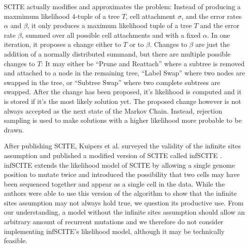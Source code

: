 \ac{SCITE} actually modifies and approximates the problem: Instead of producing a maxmimum likelihood 4-tuple of a tree $T$, cell attachment $\sigma$, and the error rates $\alpha$ and $\beta$, it only produces a maximum likelihood tuple of a tree $T$ and the error rate $\beta$, summed over all possible cell attachments and with a fixed $\alpha$. In one iteration, it proposes a change either to $T$ or to $\beta$. Changes to $\beta$ are just the addition of a normally distributed summand, but there are multiple possible changes to $T$: It may either be ``Prune and Reattach'' where a subtree is removed and attached to a node in the remaining tree, ``Label Swap'' where two nodes are swapped in the tree, or ``Subtree Swap'' where two complete subtrees are swapped. After the change has been proposed, it's likelihood is computed and it is stored if it's the most likely solution yet. The proposed change however is not always accepted as the next state of the Markov Chain. Instead, rejection sampling is used to make solutions with a higher likelihood more probable to be drawn.

After publishing \ac{SCITE}, Kuipers et al. surveyed the validity of the infinite sites assumption and published a modified version of \ac{SCITE} called \ac{infSCITE} \cite{kuipers2017single}. \ac{infSCITE} extends the likelihood model of \ac{SCITE} by allowing a single genome position to mutate twice and introduced the possibility that two cells may have been sequenced together and appear as a single cell in the data. While the authors were able to use this version of the algorithm to show that the infinite sites assumption may not always hold true, we question its productive use. From our understanding, a model without the infinite sites assumption should allow an arbitrary amount of recurrent mutations and we therefore do not consider implementing \ac{infSCITE}'s likelihood model, although it may be technically feasible.
